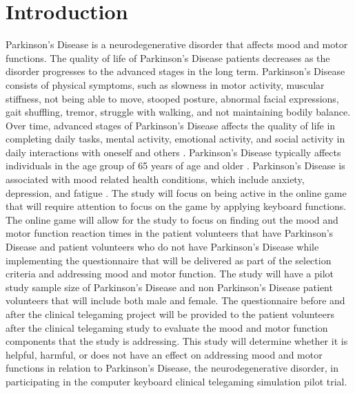 \documentclass[12pt,letterpaper]{article}
\begin{document}
\section{Introduction}
 Parkinson's Disease is a neurodegenerative disorder that affects mood and motor functions. The quality of life of Parkinson's Disease patients decreases as the disorder progresses to the advanced stages in the long term. Parkinson's Disease consists of physical symptoms, such as slowness in motor activity, muscular stiffness, not being able to move, stooped posture, abnormal facial expressions, gait shuffling, tremor, struggle with walking, and not maintaining bodily balance\cite{Jenkinson2011}. Over time, advanced stages of Parkinson's Disease affects the quality of life in completing daily tasks, mental activity, emotional activity, and social activity in daily interactions with oneself and others \cite{Jenkinson2011}. Parkinson's Disease typically affects individuals in the age group of 65 years of age and older \cite{Serrano-Duenas2008}. Parkinson's Disease is associated with mood related health conditions, which include anxiety, depression, and fatigue \cite{Wang2014}. The study will focus on being active in the online game that will require attention to focus on the game by applying keyboard functions. The online game will allow for the study to focus on finding out the mood and motor function reaction times in the patient volunteers that have Parkinson's Disease and patient volunteers who do not have Parkinson's Disease while implementing the questionnaire that will be delivered as part of the selection criteria and addressing mood and motor function. The study will have a pilot study sample size of Parkinson's Disease and non Parkinson's Disease patient volunteers that will include both male and female. The questionnaire before and after the clinical telegaming project will be provided to the patient volunteers after the clinical telegaming study to evaluate the mood and motor function components that the study is addressing. This study will determine whether it is helpful, harmful, or does not have an effect on addressing mood and motor functions in relation to Parkinson's Disease, the neurodegenerative disorder, in participating in the computer keyboard clinical telegaming simulation pilot trial. 
 
\end{document}
